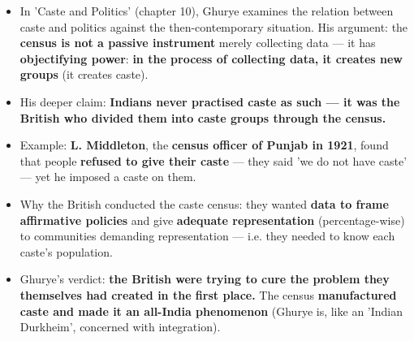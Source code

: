 \begin{KeyConcept}
\begin{itemize}
\item In 'Caste and Politics' (chapter 10), Ghurye examines the relation between caste and politics against the then-contemporary situation. His argument: the \textbf{census is not a passive instrument} merely collecting data --- it has \textbf{objectifying power}: \textbf{in the process of collecting data, it creates new groups} (it creates caste).
\item His deeper claim: \textbf{Indians never practised caste as such --- it was the British who divided them into caste groups through the census.}
\item Example: \textbf{L. Middleton}, the \textbf{census officer of Punjab in 1921}, found that people \textbf{refused to give their caste} --- they said 'we do not have caste' --- yet he imposed a caste on them.
\item Why the British conducted the caste census: they wanted \textbf{data to frame affirmative policies} and give \textbf{adequate representation} (percentage-wise) to communities demanding representation --- i.e. they needed to know each caste's population.
\item Ghurye's verdict: \textbf{the British were trying to cure the problem they themselves had created in the first place.} The census \textbf{manufactured caste and made it an all-India phenomenon} (Ghurye is, like an 'Indian Durkheim', concerned with integration).
\end{itemize}
\end{KeyConcept}

